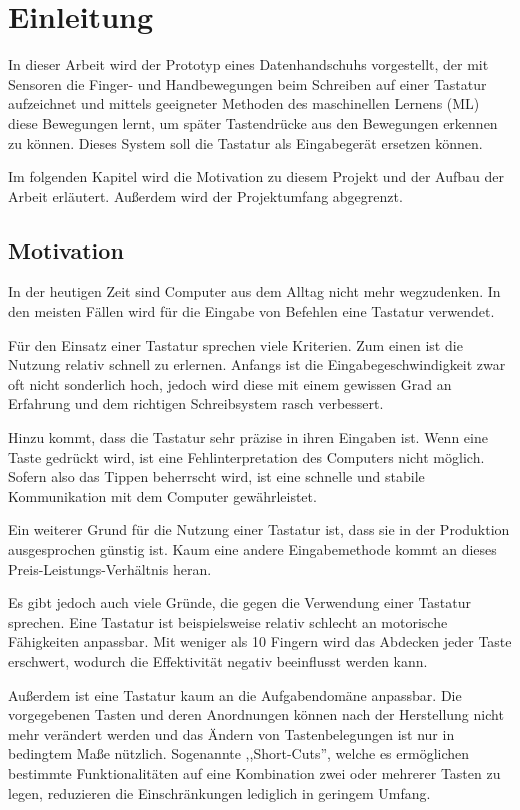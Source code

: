 \chapter{Einleitung}
In dieser Arbeit wird der Prototyp eines Datenhandschuhs vorgestellt, der mit Sensoren die Finger- und Handbewegungen beim Schreiben auf einer Tastatur aufzeichnet und mittels geeigneter Methoden des maschinellen Lernens (ML) diese Bewegungen lernt, um später Tastendrücke aus den Bewegungen erkennen zu können. Dieses System soll die Tastatur als Eingabegerät ersetzen können.

Im folgenden Kapitel wird die Motivation zu diesem Projekt und der Aufbau der Arbeit erläutert. Außerdem wird der Projektumfang abgegrenzt.

\section{Motivation}
In der heutigen Zeit sind Computer aus dem Alltag nicht mehr wegzudenken. In den meisten Fällen wird für die Eingabe von Befehlen eine Tastatur verwendet.

Für den Einsatz einer Tastatur sprechen viele Kriterien. Zum einen ist die Nutzung relativ schnell zu erlernen. Anfangs ist die Eingabegeschwindigkeit zwar oft nicht sonderlich hoch, jedoch wird diese mit einem gewissen Grad an Erfahrung und dem richtigen Schreibsystem rasch verbessert.

Hinzu kommt, dass die Tastatur sehr präzise in ihren Eingaben ist. Wenn eine Taste gedrückt wird, ist eine Fehlinterpretation des Computers nicht möglich. Sofern also das Tippen beherrscht wird, ist eine schnelle und stabile Kommunikation mit dem Computer gewährleistet.

Ein weiterer Grund für die Nutzung einer Tastatur ist, dass sie in der Produktion ausgesprochen günstig ist. Kaum eine andere Eingabemethode kommt an dieses Preis-Leistungs-Verhältnis heran.

Es gibt jedoch auch viele Gründe, die gegen die Verwendung einer Tastatur sprechen. Eine Tastatur ist beispielsweise relativ schlecht an motorische Fähigkeiten anpassbar. Mit weniger als 10 Fingern wird das Abdecken jeder Taste erschwert, wodurch die Effektivität negativ beeinflusst werden kann.

Außerdem ist eine Tastatur kaum an die Aufgabendomäne anpassbar. Die vorgegebenen Tasten und deren Anordnungen können nach der Herstellung nicht mehr verändert werden und das Ändern von Tastenbelegungen ist nur in bedingtem Maße nützlich. Sogenannte ,,Short-Cuts'', welche es ermöglichen bestimmte Funktionalitäten auf eine Kombination zwei oder mehrerer Tasten zu legen, reduzieren die Einschränkungen lediglich in geringem Umfang.

